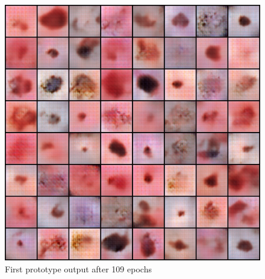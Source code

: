 \begin{figure}[H]
    \centering
    \includegraphics[width=5in]{images/fake_samples_epoch_109.png}
    \caption{First prototype output after 109 epochs}
    \label{fig:prototype-output}
\end{figure}

